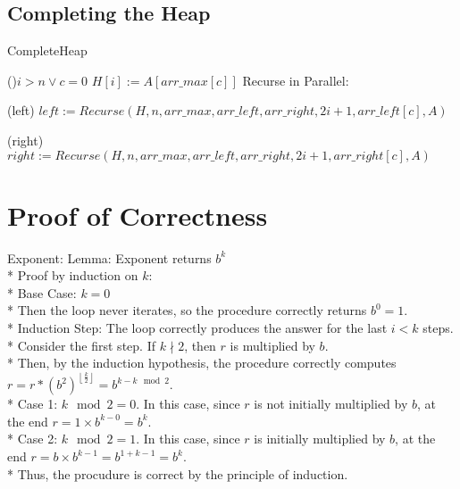 \documentclass[letterpaper, reqno, 11pt]{article}
\begin{document}
\subsection*{Completing the Heap}
\begin{algorithm}[H]
\caption{CompleteHeap}
\If(){$i>n\lor c=0$}
{
	\;
}
$H[i]:=A[arr\_max[c]]$
Recurse in Parallel:
\begin{description}
	\item{(left)} $left:=Recurse(H, n, arr\_max, arr\_left, arr\_right,
			2i+1, arr\_left[c], A)$\;
	\item{(right)} $right:=Recurse(H, n, arr\_max, arr\_left, arr\_right,
			2i+1, arr\_right[c], A)$\;
\end{description}
\end{algorithm}

\section*{Proof of Correctness}
\begin{description}
	\item{Exponent:}
	Lemma: Exponent returns $b^k$\\*
	Proof by induction on $k$:\\*
	Base Case: $k=0$\\*
		Then the loop never iterates, so the procedure correctly returns $b^0=1$.\\*
	Induction Step:	The loop correctly produces the answer for the last $i<k$ steps.\\*
	Consider the first step. If $k\nmid 2$, then $r$ is multiplied by $b$.\\*
	Then, by the induction hypothesis, the procedure correctly computes
	$r=r*(b^2)^{\left\lfloor\frac{k}{2}\right\rfloor}=b^{k-k\mod2}$.\\*
	Case 1: $k\mod 2=0$. In this case, since $r$ is not initially multiplied by $b$,
		at the end $r=1\times b^{k-0}=b^k$.\\*
	Case 2:	$k\mod 2=1$. In this case, since $r$ is initially multiplied by $b$,
		at the end $r=b\times b^{k-1}=b^{1+k-1}=b^k$.\\*
	Thus, the procudure is correct by the principle of induction.
\end{description}
\end{document}
